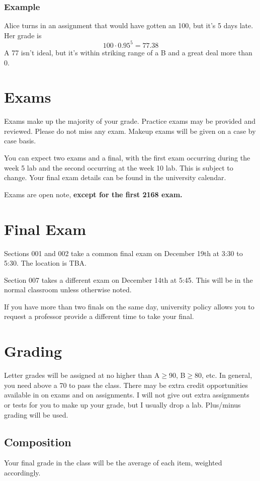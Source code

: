\documentclass[10pt, letter]{article}
\begin{document}
\subsubsection*{Example}
Alice turns in an assignment that would have gotten an 100, but it's 5 days late.  Her grade is $$100\cdot 0.95^{5} = 77.38$$ A 77 isn't ideal, but it's within striking range of a B and a great deal more than 0.

\section{Exams}
Exams make up the majority of your grade.
Practice exams may be provided and reviewed.  
Please do not miss any exam.  
Makeup exams will be given on a case by case basis.


You can expect two exams and a final, with the first exam occurring during the week 5 lab and the second occurring at the week 10 lab.
This is subject to change.
Your final exam details can be found in the university calendar.

Exams are open note, \textbf{except for the first 2168 exam.}


\section*{Final Exam}

Sections 001 and 002 take a common final exam on December 19th at 3:30 to 5:30.  
The location is TBA.

Section 007 takes a different exam on December 14th at 5:45.  This will be in the normal classroom unless otherwise noted.

If you have more than two finals on the same day, university policy allows you to request a professor provide a different time to take your final.


\section*{Grading}

Letter grades will be assigned at no higher than A$\geq$90, B$\geq$80, etc.
In general, you need above a 70 to pass the class.
There may be extra credit opportunities available in on exams and on assignments.
I will not give out extra assignments or tests for you to make up your grade, but I usually drop a lab.
Plus/minus grading will be used.
\subsection*{Composition}
Your final grade in the class will be the average of each item, weighted accordingly.
\end{document}
